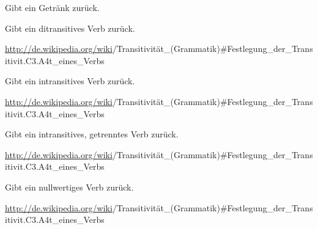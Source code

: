 \documentclass[a4paper,12pt,oneside]{sphinxmanual}
\begin{document}
\begin{fulllineitems}
\label{funktionen:pyzufall.trinken}
Gibt ein Getränk zurück.

\end{fulllineitems}


\begin{fulllineitems}
\label{funktionen:pyzufall.verbd}
Gibt ein ditransitives Verb zurück.

\href{http://de.wikipedia.org/wiki}{http://de.wikipedia.org/wiki}/Transitivität\_(Grammatik)\#Festlegung\_der\_Transitivit.C3.A4t\_eines\_Verbs

\end{fulllineitems}


\begin{fulllineitems}
\label{funktionen:pyzufall.verbi}
Gibt ein intransitives Verb zurück.

\href{http://de.wikipedia.org/wiki}{http://de.wikipedia.org/wiki}/Transitivität\_(Grammatik)\#Festlegung\_der\_Transitivit.C3.A4t\_eines\_Verbs

\end{fulllineitems}


\begin{fulllineitems}
\label{funktionen:pyzufall.verbi2}
Gibt ein intransitives, getrenntes Verb zurück.

\href{http://de.wikipedia.org/wiki}{http://de.wikipedia.org/wiki}/Transitivität\_(Grammatik)\#Festlegung\_der\_Transitivit.C3.A4t\_eines\_Verbs

\end{fulllineitems}


\begin{fulllineitems}
\label{funktionen:pyzufall.verbn}
Gibt ein nullwertiges Verb zurück.

\href{http://de.wikipedia.org/wiki}{http://de.wikipedia.org/wiki}/Transitivität\_(Grammatik)\#Festlegung\_der\_Transitivit.C3.A4t\_eines\_Verbs

\end{fulllineitems}
\end{document}
